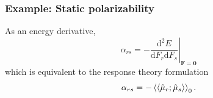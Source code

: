 \documentclass{beamer}
\begin{document}




\begin{frame}
  \frametitle{Example: Static polarizability}
  As an energy derivative,
  \begin{equation*}
    \alpha_{rs} = - \left. \frac{\text{d}^{2}E}{\text{d}F_{r}\text{d}F_{s}} \right|_{\mathbf{F}=\mathbf{0}}
  \end{equation*}
  which is equivalent to the response theory formulation
  \begin{equation*}
    \alpha_{rs} = - \braket{\braket{\hat{\mu}_{r};\hat{\mu}_{s}}}_{0}.
  \end{equation*}
\end{frame}
\end{document}
